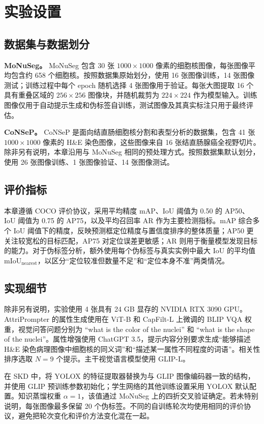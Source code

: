 \section{实验设置}

\subsection{数据集与数据划分}

\textbf{MoNuSeg。} MoNuSeg 包含 30 张 $1000\times1000$ 像素的细胞核图像，每张图像平均包含约 658 个细胞核。按照数据集原始划分，使用 16 张图像训练，14 张图像测试；训练过程中每个 epoch 随机选择 4 张图像用于验证。每张大图提取 16 个具有重叠区域的 $256\times256$ 图像块，并随机裁剪为 $224\times224$ 作为模型输入。训练图像仅用于自动提示生成和伪标签自训练，测试图像及其真实标注只用于最终评估。

\textbf{CoNSeP。} CoNSeP 是面向结直肠细胞核分割和表型分析的数据集，包含 41 张 $1000\times1000$ 像素的 H\&E 染色图像，这些图像来自 16 张结直肠腺癌全视野切片。除非另有说明，本章沿用与 MoNuSeg 相同的预处理方式。按照数据集默认划分，使用 26 张图像训练、1 张图像验证、14 张图像测试。

\subsection{评价指标}

本章遵循 COCO 评价协议，采用平均精度 mAP、IoU 阈值为 0.50 的 AP50、IoU 阈值为 0.75 的 AP75，以及平均召回率 AR 作为主要检测指标。mAP 综合多个 IoU 阈值下的精度，反映预测框定位精度与置信度排序的整体质量；AP50 更关注较宽松的目标匹配，AP75 对定位误差更敏感；AR 则用于衡量模型发现目标的能力。对于伪标签分析，额外使用每个伪标签与真实实例中最大 IoU 的平均值 $\mathrm{mIoU}_{\mathrm{nearest}}$，以区分“定位较准但数量不足”和“定位本身不准”两类情况。

\subsection{实现细节}

除非另有说明，实验使用 4 张具有 24 GB 显存的 NVIDIA RTX 3090 GPU。AttriPrompter 的属性生成使用在 ViT-B 和 CapFilt-L 上微调的 BLIP VQA 权重，视觉问答问题分别为 ``what is the color of the nuclei'' 和 ``what is the shape of the nuclei''。属性增强使用 ChatGPT 3.5，提示内容分别要求生成“能够描述 H\&E 染色病理图像中细胞核的同义词”和“描述某一属性不同程度的词语”。相关性排序选取 $N=9$ 个提示。主干视觉语言模型使用 GLIP-L。

在 SKD 中，将 YOLOX 的特征提取器替换为与 GLIP 图像编码器一致的结构，并使用 GLIP 预训练参数初始化；学生网络的其他训练设置采用 YOLOX 默认配置。知识蒸馏权重 $\alpha=1$，该值通过 MoNuSeg 上的四折交叉验证确定。若未特别说明，每张图像最多保留 20 个伪标签。不同的自训练轮次均使用相同的评价协议，避免把轮次变化和评价方法变化混在一起。

